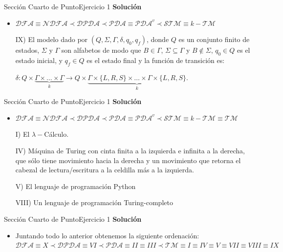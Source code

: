 \documentclass[10pt, envcountsect, presentation, aspectratio=169]{beamer}
\begin{document}
\begin{frame}{Sección Cuarto de Punto}{Ejercicio 1}
    \textbf{Solución}\\
    \begin{itemize}
        \item $\mathcal{DFA} \equiv \mathcal{NDFA} \prec \mathcal{DPDA} \prec \mathcal{PDA} \equiv \mathcal{PDA}^v \prec \mathcal{STM} \equiv k-\mathcal{TM}$
        \item[IX)] El modelo dado por $(Q,\Sigma,\Gamma,\delta,q_0,q_f)$, donde $Q$ es un conjunto finito de estados, $\Sigma$ y $\Gamma$ son alfabetos de modo que $B\in\Gamma$,  $\Sigma\subseteq\Gamma$ y $B \notin \Sigma$, $q_0\in Q$ es el estado inicial, y $q_f\in Q$ es el estado final y la función de transición es:
        \begin{small}
            $\delta:Q\times\underbrace{\Gamma\times\ldots\times\Gamma}_k\rightarrow Q\times\underbrace{\Gamma\times\{L,R,S\}\times\ldots\times\Gamma\times\{L,R,S\}}_k$.
        \end{small} 
    \end{itemize}
\end{frame}


\begin{frame}{Sección Cuarto de Punto}{Ejercicio 1}
    \textbf{Solución}\\
    \begin{itemize}
        \item $\mathcal{DFA} \equiv \mathcal{NDFA} \prec \mathcal{DPDA} \prec \mathcal{PDA} \equiv \mathcal{PDA}^v \prec \mathcal{STM} \equiv k-\mathcal{TM} \equiv \mathcal{TM}$
        \item[I)] El $\lambda-$Cálculo.
        \item[IV)] Máquina de Turing con cinta finita a la izquierda e infinita a la derecha, que sólo tiene movimiento hacia la derecha y un movimiento que retorna el cabezal de lectura/escritura a la celdilla más a la izquierda.
        \item[V)] El lenguaje de programación Python
        \item[VIII)] Un lenguaje de programación Turing-completo 
    \end{itemize}
\end{frame}


\begin{frame}{Sección Cuarto de Punto}{Ejercicio 1}
    \textbf{Solución}\\
    \begin{itemize}
        \item Juntando  todo lo anterior obtenemos la siguiente ordenación:\\
        \vspace{3mm}
        $\mathcal{DFA} \equiv X \prec \mathcal{DPDA} \equiv VI \prec \mathcal{PDA} \equiv II \equiv III \prec \mathcal{TM} \equiv I \equiv IV \equiv V \equiv VII \equiv VIII \equiv IX$
    \end{itemize}
\end{frame}
\end{document}
